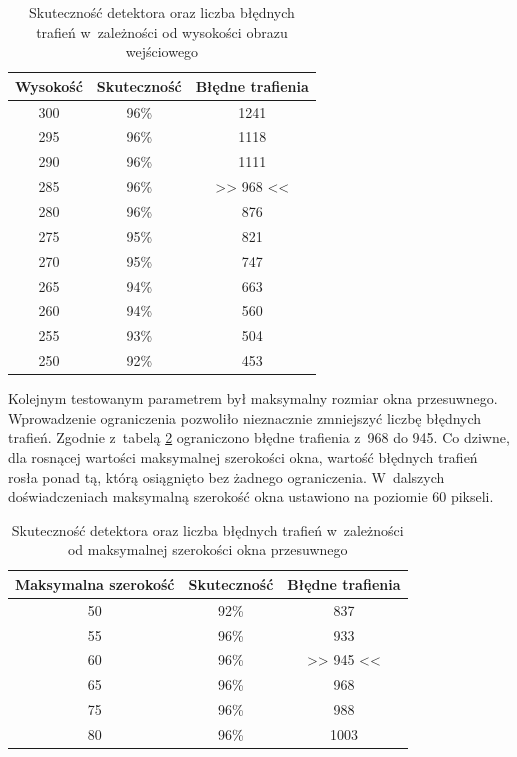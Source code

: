 \begin{table}[!h]
    \centering
    \begin{tabular}{c|c|c}
        Wysokość & Skuteczność & Błędne trafienia
        \\ \hline
        300 & 96\% & 1241 \\
        295 & 96\% & 1118 \\
        290 & 96\% & 1111 \\
        285 & 96\% & >> 968 <<\\
        280 & 96\% & 876 \\
        275 & 95\% & 821 \\
        270 & 95\% & 747 \\
        265 & 94\% & 663 \\
        260 & 94\% & 560 \\
        255 & 93\% & 504 \\
        250 & 92\% & 453 \\
    \end{tabular}
    \caption{Skuteczność detektora oraz liczba błędnych trafień
    w~zależności od wysokości obrazu wejściowego}
    \label{tab:final_number_detector_resize}
\end{table}

Kolejnym testowanym parametrem był maksymalny rozmiar okna przesuwnego.
Wprowadzenie ograniczenia pozwoliło nieznacznie zmniejszyć
liczbę błędnych trafień. Zgodnie z~tabelą
\ref{tab:final_number_detector_maxsize} ograniczono 
błędne trafienia z~968 do 945. Co dziwne, dla rosnącej 
wartości maksymalnej szerokości okna, wartość błędnych
trafień rosła ponad tą, którą osiągnięto bez żadnego
ograniczenia. W~dalszych doświadczeniach maksymalną szerokość
okna ustawiono na poziomie 60 pikseli.

\begin{table}[!h]
    \centering
    \begin{tabular}{c|c|c}
        Maksymalna szerokość & Skuteczność & Błędne trafienia
        \\ \hline
        50 & 92\% & 837 \\
        55 & 96\% & 933 \\
        60 & 96\% & >> 945 << \\
        65 & 96\% & 968 \\
        75 & 96\% & 988 \\
        80 & 96\% & 1003 \\
    \end{tabular}
    \caption{Skuteczność detektora oraz liczba błędnych trafień
    w~zależności od maksymalnej szerokości okna przesuwnego}
    \label{tab:final_number_detector_maxsize}
\end{table}

